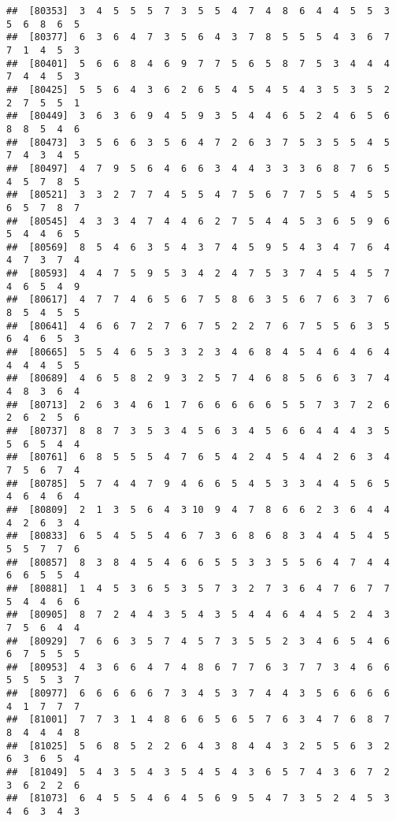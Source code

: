 \documentclass[
]{book}
\begin{document}
\begin{verbatim}
##  [80353]  3  4  5  5  5  7  3  5  5  4  7  4  8  6  4  4  5  5  3  5  6  8  6  5
##  [80377]  6  3  6  4  7  3  5  6  4  3  7  8  5  5  5  4  3  6  7  7  1  4  5  3
##  [80401]  5  6  6  8  4  6  9  7  7  5  6  5  8  7  5  3  4  4  4  7  4  4  5  3
##  [80425]  5  5  6  4  3  6  2  6  5  4  5  4  5  4  3  5  3  5  2  2  7  5  5  1
##  [80449]  3  6  3  6  9  4  5  9  3  5  4  4  6  5  2  4  6  5  6  8  8  5  4  6
##  [80473]  3  5  6  6  3  5  6  4  7  2  6  3  7  5  3  5  5  4  5  7  4  3  4  5
##  [80497]  4  7  9  5  6  4  6  6  3  4  4  3  3  3  6  8  7  6  5  4  5  7  8  5
##  [80521]  3  3  2  7  7  4  5  5  4  7  5  6  7  7  5  5  4  5  5  6  5  7  8  7
##  [80545]  4  3  3  4  7  4  4  6  2  7  5  4  4  5  3  6  5  9  6  5  4  4  6  5
##  [80569]  8  5  4  6  3  5  4  3  7  4  5  9  5  4  3  4  7  6  4  4  7  3  7  4
##  [80593]  4  4  7  5  9  5  3  4  2  4  7  5  3  7  4  5  4  5  7  4  6  5  4  9
##  [80617]  4  7  7  4  6  5  6  7  5  8  6  3  5  6  7  6  3  7  6  8  5  4  5  5
##  [80641]  4  6  6  7  2  7  6  7  5  2  2  7  6  7  5  5  6  3  5  6  4  6  5  3
##  [80665]  5  5  4  6  5  3  3  2  3  4  6  8  4  5  4  6  4  6  4  4  4  4  5  5
##  [80689]  4  6  5  8  2  9  3  2  5  7  4  6  8  5  6  6  3  7  4  4  8  3  6  4
##  [80713]  2  6  3  4  6  1  7  6  6  6  6  6  5  5  7  3  7  2  6  2  6  2  5  6
##  [80737]  8  8  7  3  5  3  4  5  6  3  4  5  6  6  4  4  4  3  5  5  6  5  4  4
##  [80761]  6  8  5  5  5  4  7  6  5  4  2  4  5  4  4  2  6  3  4  7  5  6  7  4
##  [80785]  5  7  4  4  7  9  4  6  6  5  4  5  3  3  4  4  5  6  5  4  6  4  6  4
##  [80809]  2  1  3  5  6  4  3 10  9  4  7  8  6  6  2  3  6  4  4  4  2  6  3  4
##  [80833]  6  5  4  5  5  4  6  7  3  6  8  6  8  3  4  4  5  4  5  5  5  7  7  6
##  [80857]  8  3  8  4  5  4  6  6  5  5  3  3  5  5  6  4  7  4  4  6  6  5  5  4
##  [80881]  1  4  5  3  6  5  3  5  7  3  2  7  3  6  4  7  6  7  7  5  4  4  6  6
##  [80905]  8  7  2  4  4  3  5  4  3  5  4  4  6  4  4  5  2  4  3  7  5  6  4  4
##  [80929]  7  6  6  3  5  7  4  5  7  3  5  5  2  3  4  6  5  4  6  6  7  5  5  5
##  [80953]  4  3  6  6  4  7  4  8  6  7  7  6  3  7  7  3  4  6  6  5  5  5  3  7
##  [80977]  6  6  6  6  6  7  3  4  5  3  7  4  4  3  5  6  6  6  6  4  1  7  7  7
##  [81001]  7  7  3  1  4  8  6  6  5  6  5  7  6  3  4  7  6  8  7  8  4  4  4  8
##  [81025]  5  6  8  5  2  2  6  4  3  8  4  4  3  2  5  5  6  3  2  6  3  6  5  4
##  [81049]  5  4  3  5  4  3  5  4  5  4  3  6  5  7  4  3  6  7  2  3  6  2  2  6
##  [81073]  6  4  5  5  4  6  4  5  6  9  5  4  7  3  5  2  4  5  3  4  6  3  4  3

\end{verbatim}
\end{document}
